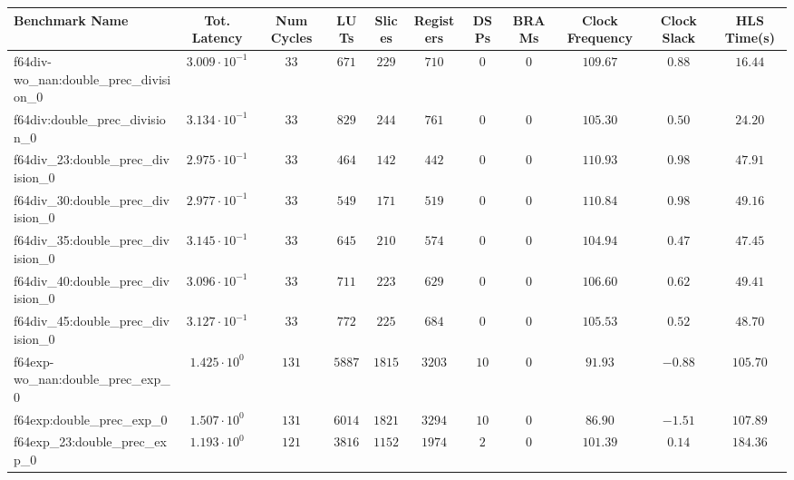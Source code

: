 \begin{tabular}{|l|c|c|c|c|c|c|c|c|c|c|}
\hline
Benchmark Name                                 & Tot. Latency            & Num Cycles & LUTs       & Slices    & Registers & DSPs    & BRAMs & Clock Frequency & Clock Slack & HLS Time(s) \\
\hline
f64div-wo\_nan:double\_prec\_division\_0       & $ 3.009 \cdot 10^{-1} $ & $ 33     $ & $ 671    $ & $ 229   $ & $ 710   $ & $ 0   $ & $ 0 $ & $ 109.67      $ & $ 0.88    $ & $ 16.44   $ \\
f64div:double\_prec\_division\_0               & $ 3.134 \cdot 10^{-1} $ & $ 33     $ & $ 829    $ & $ 244   $ & $ 761   $ & $ 0   $ & $ 0 $ & $ 105.30      $ & $ 0.50    $ & $ 24.20   $ \\
f64div\_23:double\_prec\_division\_0           & $ 2.975 \cdot 10^{-1} $ & $ 33     $ & $ 464    $ & $ 142   $ & $ 442   $ & $ 0   $ & $ 0 $ & $ 110.93      $ & $ 0.98    $ & $ 47.91   $ \\
f64div\_30:double\_prec\_division\_0           & $ 2.977 \cdot 10^{-1} $ & $ 33     $ & $ 549    $ & $ 171   $ & $ 519   $ & $ 0   $ & $ 0 $ & $ 110.84      $ & $ 0.98    $ & $ 49.16   $ \\
f64div\_35:double\_prec\_division\_0           & $ 3.145 \cdot 10^{-1} $ & $ 33     $ & $ 645    $ & $ 210   $ & $ 574   $ & $ 0   $ & $ 0 $ & $ 104.94      $ & $ 0.47    $ & $ 47.45   $ \\
f64div\_40:double\_prec\_division\_0           & $ 3.096 \cdot 10^{-1} $ & $ 33     $ & $ 711    $ & $ 223   $ & $ 629   $ & $ 0   $ & $ 0 $ & $ 106.60      $ & $ 0.62    $ & $ 49.41   $ \\
f64div\_45:double\_prec\_division\_0           & $ 3.127 \cdot 10^{-1} $ & $ 33     $ & $ 772    $ & $ 225   $ & $ 684   $ & $ 0   $ & $ 0 $ & $ 105.53      $ & $ 0.52    $ & $ 48.70   $ \\
f64exp-wo\_nan:double\_prec\_exp\_0            & $ 1.425 \cdot 10^{0}  $ & $ 131    $ & $ 5887   $ & $ 1815  $ & $ 3203  $ & $ 10  $ & $ 0 $ & $ 91.93       $ & $ -0.88   $ & $ 105.70  $ \\
f64exp:double\_prec\_exp\_0                    & $ 1.507 \cdot 10^{0}  $ & $ 131    $ & $ 6014   $ & $ 1821  $ & $ 3294  $ & $ 10  $ & $ 0 $ & $ 86.90       $ & $ -1.51   $ & $ 107.89  $ \\
f64exp\_23:double\_prec\_exp\_0                & $ 1.193 \cdot 10^{0}  $ & $ 121    $ & $ 3816   $ & $ 1152  $ & $ 1974  $ & $ 2   $ & $ 0 $ & $ 101.39      $ & $ 0.14    $ & $ 184.36  $ \\

\end{tabular}
